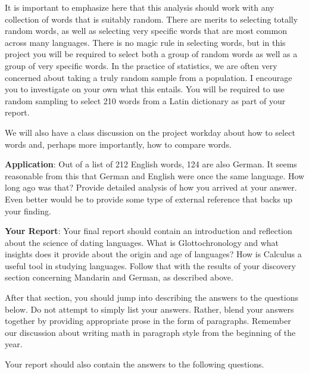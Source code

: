 \documentclass
[justified,nohyper]
{tufte-handout}
\begin{document}
It is important to emphasize here that this analysis should work with any
collection of words that is suitably random. There are merits to selecting
totally random words, as well as selecting very specific words that are most
common across many languages. There is no magic rule in selecting words, but
in this project you will be required to select both a group of random words
as well as a group of very specific words. In the practice of statistics,
we are often very concerned about taking a truly random sample from a population.
I encourage you to investigate on your own what this entails. You will be
required to use random sampling to select 210 words from a Latin dictionary
as part of your report.

We will also have a class discussion on the project workday about how to select
words and, perhaps more importantly, how to compare words.

\textbf{Application}: Out of a list of 212 English words, 124 are also German.
It seems reasonable from this that German and English were once the same
language. How long ago was that? Provide detailed analysis of how you arrived
at your answer. Even better would be to provide some type of external reference
that backs up your finding.

\textbf{Your Report}: Your final report should contain an introduction and
reflection about the science of dating languages. What is Glottochronology 
and what insights does it provide about the origin and age of languages? How is
Calculus a useful tool in studying languages. Follow that with the results of
your discovery section concerning Mandarin and German, as described above.

After that section, you should jump into describing the answers to the questions
below. Do not attempt to simply list your answers. Rather, blend your answers
together by providing appropriate prose in the form of paragraphs. Remember
our discussion about writing math in paragraph style from the beginning of the
year.

Your report should also contain the answers to the following questions.
\end{document}
